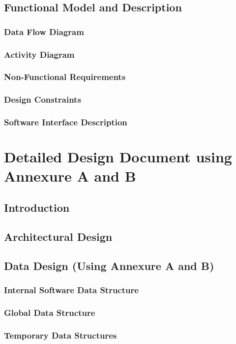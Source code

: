 \documentclass[a4paper, oneside, 12pt]{book}
\begin{document}
		\subsection{Functional Model and Description}
			\subsubsection{Data Flow Diagram}
			\subsubsection{Activity Diagram}
			\subsubsection{Non-Functional Requirements}
			\subsubsection{Design Constraints}
			\subsubsection{Software Interface Description}
	\newpage	
	\section{Detailed Design Document using Annexure A and B}
	\newpage
		\subsection{Introduction}
		\subsection{Architectural Design}
		\subsection{Data Design (Using Annexure A and B)}
			\subsubsection{Internal Software Data Structure}
			\subsubsection{Global Data Structure}
			\subsubsection{Temporary Data Structures}
\end{document}
